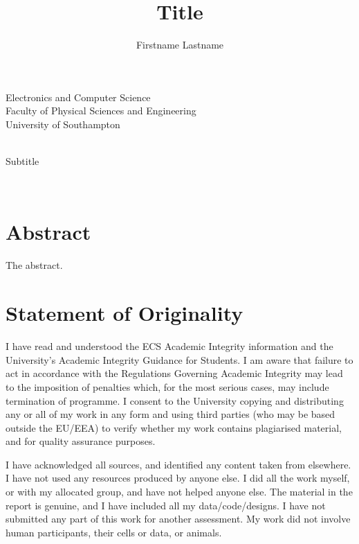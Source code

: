 \documentclass[12pt,a4paper]{article} %
\title{Title} %
\author{Firstname Lastname} %
\newcommand{\subtitle}{Subtitle} %
\begin{document}

\makeatletter
\begin{titlepage}
	\thispagestyle{empty}
	\centering
	\Large
	\vspace*{5\baselineskip}
	
	Electronics and Computer Science\\
	Faculty of Physical Sciences and Engineering\\
	University of Southampton
	\vspace*{\fill}

	{\Huge\bfseries\@title\\}
	\subtitle
	\vspace*{\fill}

	\@author\\
	\@date
	
	\vspace*{10\baselineskip}
\end{titlepage}
\makeatother


\section*{Abstract}

The abstract.

\newpage
\section*{Statement of Originality}

I have read and understood the ECS Academic Integrity information and the University's Academic Integrity Guidance for Students.
I am aware that failure to act in accordance with the Regulations Governing Academic Integrity may lead to the imposition of penalties which, for the most serious cases, may include termination of programme.
I consent to the University copying and distributing any or all of my work in any form and using third parties (who may be based outside the EU/EEA) to verify whether my work contains plagiarised material, and for quality assurance purposes.

I have acknowledged all sources, and identified any content taken from elsewhere.
I have not used any resources produced by anyone else.
I did all the work myself, or with my allocated group, and have not helped anyone else.
The material in the report is genuine, and I have included all my data/code/designs.
I have not submitted any part of this work for another assessment.
My work did not involve human participants, their cells or data, or animals.
\end{document}
